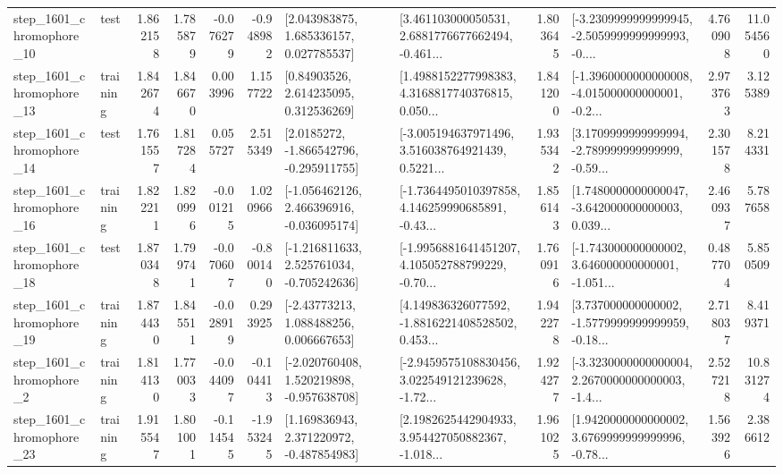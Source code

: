 \begin{tabular}{llrrrrllrlrr}
 step\_1601\_chromophore\_10 &      test &      1.862158 &    1.785879 &     -0.076279 & -0.948982 &     [2.043983875, 1.685336157, 0.027785537] &  [3.461103000050531, 2.6881776677662494, -0.461... &       1.803645 &  [-3.2309999999999945, -2.5059999999999993, -0.... &            4.760908 &         11.054560 \\
 step\_1601\_chromophore\_13 &  training &      1.842674 &    1.846670 &      0.003996 &  1.157722 &      [0.84903526, 2.614235095, 0.312536269] &  [1.4988152277998383, 4.3168817740376815, 0.050... &       1.841200 &  [-1.3960000000000008, -4.015000000000001, -0.2... &            2.973763 &          3.125389 \\
 step\_1601\_chromophore\_14 &      test &      1.761557 &    1.817284 &      0.055727 &  2.515349 &     [2.0185272, -1.866542796, -0.295911755] &  [-3.005194637971496, 3.516038764921439, 0.5221... &       1.935342 &  [3.1709999999999994, -2.789999999999999, -0.59... &            2.301578 &          8.214331 \\
 step\_1601\_chromophore\_16 &  training &      1.822211 &    1.820996 &     -0.001215 &  1.020966 &   [-1.056462126, 2.466396916, -0.036095174] &  [-1.7364495010397858, 4.146259990685891, -0.43... &       1.856143 &  [1.7480000000000047, -3.642000000000003, 0.039... &            2.460937 &          5.787658 \\
 step\_1601\_chromophore\_18 &      test &      1.870348 &    1.799741 &     -0.070607 & -0.800140 &   [-1.216811633, 2.525761034, -0.705242636] &  [-1.9956881641451207, 4.105052788799229, -0.70... &       1.760916 &  [-1.743000000000002, 3.646000000000001, -1.051... &            0.487704 &          5.850509 \\
 step\_1601\_chromophore\_19 &  training &      1.874430 &    1.845511 &     -0.028919 &  0.293925 &     [-2.43773213, 1.088488256, 0.006667653] &  [4.149836326077592, -1.8816221408528502, 0.453... &       1.942278 &  [3.737000000000002, -1.5779999999999959, -0.18... &            2.718037 &          8.419371 \\
  step\_1601\_chromophore\_2 &  training &      1.814130 &    1.770033 &     -0.044097 & -0.104413 &   [-2.020760408, 1.520219898, -0.957638708] &  [-2.9459575108830456, 3.022549121239628, -1.72... &       1.924277 &  [-3.3230000000000004, 2.2670000000000003, -1.4... &            2.527218 &         10.831274 \\
 step\_1601\_chromophore\_23 &  training &      1.915547 &    1.801001 &     -0.114545 & -1.953245 &    [1.169836943, 2.371220972, -0.487854983] &  [2.1982625442904933, 3.954427050882367, -1.018... &       1.961025 &  [1.9420000000000002, 3.6769999999999996, -0.78... &            1.563926 &          2.386612 \\

\end{tabular}
